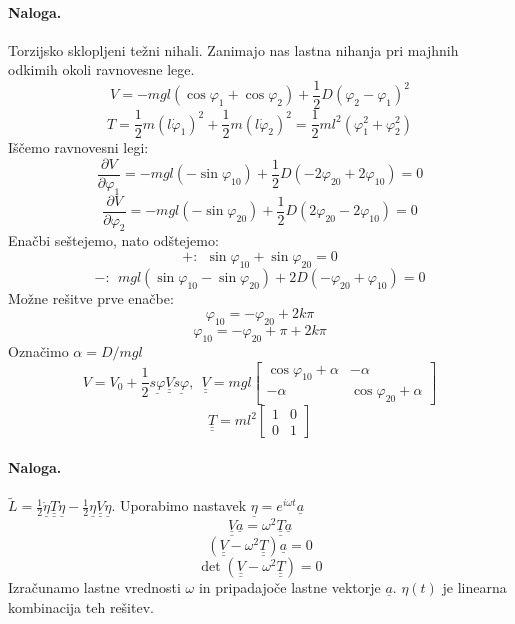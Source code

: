 \documentclass[a4paper]{article}
\newcommand{\pd}[2]{\frac{\partial {#1}}{\partial {#2}}}
\newcommand{\duline}[1]{\underline{\underline{#1}}}
\begin{document}
\paragraph{Naloga.} Torzijsko sklopljeni težni nihali. Zanimajo nas lastna nihanja pri majhnih odkimih okoli ravnovesne lege.
$$V = -mgl(\cos\varphi_1 + \cos\varphi_2) + \frac{1}{2}D(\varphi_2 - \varphi_1)^2$$
$$T = \frac{1}{2}m(l\dot\varphi_1)^2 + \frac{1}{2}m(l\dot\varphi_2)^2 = \frac{1}{2}ml^2(\varphi_1^2 + \varphi_2^2)$$
Iščemo ravnovesni legi:
$$\pd{V}{\varphi_1} = -mgl(-\sin\varphi_{10}) + \frac{1}{2}D(-2\varphi_{20} + 2\varphi_{10}) = 0$$
$$\pd{V}{\varphi_2} = -mgl(-\sin\varphi_{20}) + \frac{1}{2}D(2\varphi_{20} - 2\varphi_{10}) = 0$$
Enačbi seštejemo, nato odštejemo:
$$+: ~~\sin\varphi_{10} + \sin\varphi_{20} = 0$$
$$-: ~~ mgl(\sin\varphi_{10} - \sin\varphi_{20}) + 2D(-\varphi_{20} + \varphi_{10}) = 0$$
Možne rešitve prve enačbe:
$$\varphi_{10} = -\varphi_{20} + 2k\pi$$
$$\varphi_{10} = -\varphi_{20} + \pi + 2k\pi$$
Označimo $\alpha = D/mgl$
$$V = V_0 + \frac{1}{2}\underline{s\varphi}\duline{V}\underline{s\varphi},~~\duline{V} = mgl\begin{bmatrix}
    \cos\varphi_{10} + \alpha & -\alpha \\
    -\alpha & \cos\varphi_{20} + \alpha
\end{bmatrix}$$
$$\duline{T} = ml^2\begin{bmatrix}
    1 & 0 \\
    0 & 1
\end{bmatrix}$$
\paragraph{Naloga.} $\tilde{L} = \frac{1}{2}\underline{\dot\eta}\duline{T}\underline{\dot\eta} - \frac{1}{2}\underline{\eta}\duline{V}\underline{\eta}$.
Uporabimo nastavek $\underline{\eta} = e^{i \omega t}\underline{a}$
$$\duline{V}\underline{a} = \omega^2 \duline{T} \underline{a}$$
$$(\duline{V} - \omega^2\duline{T})\underline{a} = 0$$
$$\det (\duline{V} - \omega^2\duline{T}) = 0$$
Izračunamo lastne vrednosti $\omega$ in pripadajoče lastne vektorje $\underline{a}$. $\eta(t)$ je linearna kombinacija teh rešitev.
\end{document}
